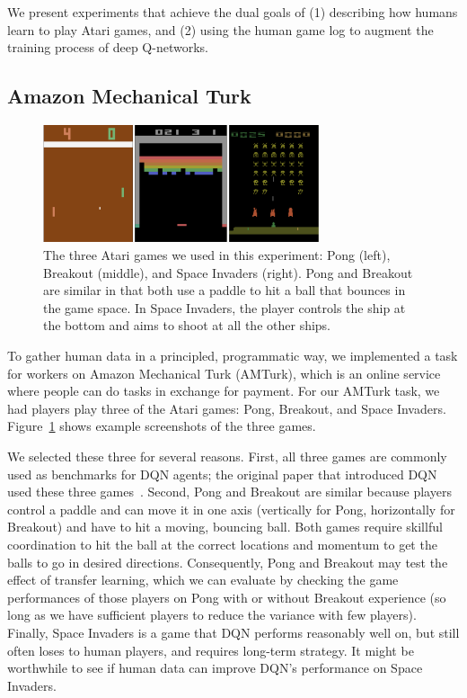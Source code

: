 \documentclass[letterpaper, 10 pt, conference]{ieeeconf}  %
\begin{document}
We present experiments that achieve the dual goals of (1) describing how humans learn to play Atari
games, and (2) using the human game log to augment the training process of deep Q-networks.

\subsection{Amazon Mechanical Turk}\label{ssec:human_experiment}

\begin{figure}[t]
\centering
\includegraphics[width=3.2in]{fig_atari_games}
\caption{The three Atari games we used in this experiment: Pong (left), Breakout (middle), and Space
Invaders (right). Pong and Breakout are similar in that both use a paddle to hit a ball that bounces
in the game space. In Space Invaders, the player controls the ship at the bottom and aims to shoot
at all the other ships.}
\label{fig:atari}
\end{figure}

To gather human data in a principled, programmatic way, we implemented a task for workers on Amazon
Mechanical Turk (AMTurk), which is an online service where people can do tasks in exchange for
payment. For our AMTurk task, we had players play three of the Atari games: Pong, Breakout, and
Space Invaders. Figure~\ref{fig:atari} shows example screenshots of the three games.

We selected these three for several reasons. First, all three games are commonly used as benchmarks
for DQN agents; the original paper that introduced DQN used these three
games~\cite{mnih-atari-2013}. Second, Pong and Breakout are similar because players control a
paddle and can move it in one axis (vertically for Pong, horizontally for Breakout) and have to
hit a moving, bouncing ball. Both games require skillful coordination to hit the
ball at the correct locations and momentum to get the balls to go in desired directions.
Consequently, Pong and Breakout may test the effect of transfer learning, which we can evaluate by
checking the game performances of those players on Pong with or without Breakout experience (so long
as we have sufficient players to reduce the variance with few players). Finally, Space Invaders is a
game that DQN performs reasonably well on, but still often loses to human players, and requires
long-term strategy. It might be worthwhile to see if human data can improve DQN's performance on
Space Invaders.
\end{document}
